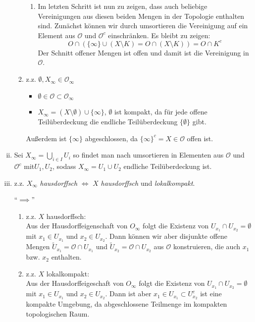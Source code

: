 \documentclass{scrartcl}
\begin{document}
\begin{aufgabe}
\begin{enumerate}[(i)]
\begin{enumerate}[(T1)]
\begin{enumerate}
\item Im letzten Schritt ist nun zu zeigen, dass auch beliebige Vereinigungen aus diesen beiden Mengen in der Topologie enthalten sind.  Zunächst können wir durch umsortieren die Vereinigung auf ein Element aus $ \mathcal O $ und $ \mathcal O^c $ einschränken. Es bleibt zu zeigen:
\[
O\cap (\{\infty\} \cup (X\setminus K)=O\cap(X\setminus K))=O\cap K^c
\]
Der Schnitt offener Mengen ist offen und damit ist die Vereinigung in $ \mathcal O $.
\end{enumerate}
\item z.z. $ \emptyset, X_\infty \in \mathcal O_\infty $
\begin{itemize}
\item $ \emptyset \in \mathcal O\subset \mathcal O_\infty $
\item $ X_\infty=(X\setminus \emptyset) \cup \{\infty\}$, $ \emptyset $ ist kompakt, da für jede offene Teilüberdeckung die endliche Teilüberdeckung $ \{\emptyset\} $ gibt.
\end{itemize}
Außerdem ist $ \{\infty\} $ abgeschlossen, da $ \{\infty\}^c=X\in \mathcal O $ offen ist.
\end{enumerate}
\item Sei $ X_\infty=\bigcup_{i\in I} U_i$ so findet man nach umsortieren in Elementen aus $ \mathcal O $ und $ \mathcal O^c$ mit$ U_1, U_2 $, sodass $ X_\infty = U_1 \cup U_2 $ endliche Teilüberdeckung ist.
\item z.z. $ X_\infty $ \emph{hausdorffsch} $ \iff  $ $ X $ \emph{hausdorffsch} und \emph{lokalkompakt}.\\
\begin{seg}{"`$ \implies $"'}
\begin{enumerate}
\item z.z. $ X $ hausdorffsch:\\
Aus der Hausdorffeigenschaft von $ O_\infty $ folgt die Existenz von $ U_{x_1}\cap U_{x_2}=\emptyset $ mit $ x_1\in U_{x_1} $ und $ x_2\in U_{x_2} $.  Dann können wir aber disjunkte offene Mengen $ \tilde U_{x_1}=\mathcal O \cap U_{x_1} $ und $ \tilde U_{x_2}=\mathcal O \cap U_{x_2} $ aus $ \mathcal O $ konstruieren, die auch $ x_1 $ bzw. $ x_2 $ enthalten.
\item z.z. $ X $ lokalkompakt:\\
Aus der Hausdorffeigeschaft von $ O_\infty $ folgt die Existenz von $ U_{x_1}\cap U_{x_2}=\emptyset $ mit $ x_1\in U_{x_1} $ und $ x_2\in U_{x_2} $. Dann ist aber $ x_1\in U_{x_1}\subset U_{x_2}^c $ ist eine kompakte Umgebung, da abgeschlossene Teilmenge im kompakten topologischen Raum.

\end{enumerate}
\end{seg}
\end{enumerate}
\end{aufgabe}
\end{document}
